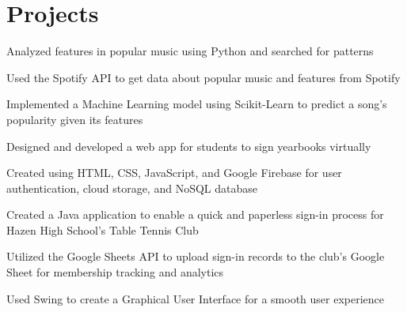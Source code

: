 \documentclass[]{deedy-resume}
\begin{document}
\begin{minipage}[t]{0.66\textwidth}

\section{Projects}
\begin{tightemize}
\item Analyzed features in popular music using Python and searched for patterns
\item Used the Spotify API to get data about popular music and features from Spotify
\item Implemented a Machine Learning model using Scikit-Learn to predict a song's popularity given its features
\end{tightemize}
\sectionsep

\begin{tightemize}
\item Designed and developed a web app for students to sign yearbooks virtually
\item Created using HTML, CSS, JavaScript, and Google Firebase for user authentication, cloud storage, and NoSQL database
\end{tightemize}
\sectionsep

\begin{tightemize}
\item Created a Java application to enable a quick and paperless sign-in process for Hazen High School's Table Tennis Club
\item Utilized the Google Sheets API to upload sign-in records to the club's Google Sheet for membership tracking and analytics
\item Used Swing to create a Graphical User Interface for a smooth user experience
\end{tightemize}
\sectionsep


%
%
%

\end{minipage} 
\end{document}
